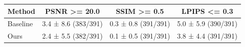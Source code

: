 \begin{tabular}{lccc}
\toprule
Method & PSNR >= 20.0 & SSIM >= 0.5 & LPIPS <= 0.3 \\
\midrule
Baseline & 3.4 ± 8.6 (383/391) & 0.3 ± 0.8 (391/391) & 5.0 ± 5.9 (390/391) \\
Ours & 2.4 ± 5.5 (382/391) & 0.1 ± 0.5 (391/391) & 3.8 ± 4.4 (391/391) \\
\bottomrule
\end{tabular}
